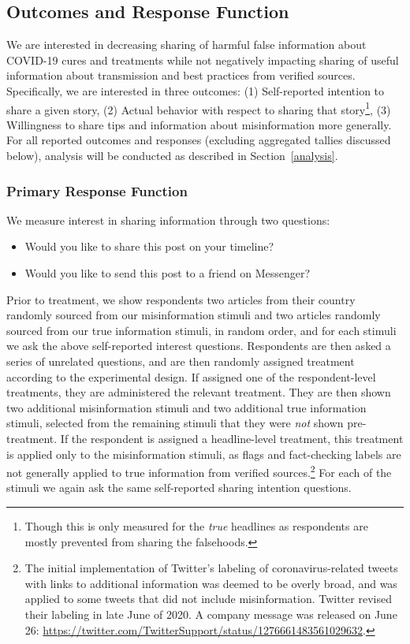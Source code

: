 \documentclass[letterpaper, 12pt, parskip=full,]{scrartcl}
\begin{document}
\subsection{Outcomes and Response Function}

We are interested in decreasing sharing of harmful false information about COVID-19 cures and treatments while not negatively impacting sharing of useful information about transmission and best practices from verified sources. Specifically, we are interested in three outcomes: (1) Self-reported intention to share a given story, (2) Actual behavior with respect to sharing that story\footnote{Though this is only measured for the \textit{true} headlines as respondents are mostly prevented from sharing the falsehoods.}, (3) Willingness to share tips and information about misinformation more generally. For all reported outcomes and responses (excluding aggregated tallies discussed below), analysis will be conducted as described in Section~\ref{analysis}.  

\subsubsection{Primary Response Function}

We measure interest in sharing information through two questions:
\begin{itemize}
\item Would you like to share this post on your timeline? 
\item Would you like to send this post to a friend on Messenger?
\end{itemize}

Prior to treatment, we show respondents two articles from their country randomly sourced from our misinformation stimuli and two articles randomly sourced from our true information stimuli, in random order, and for each stimuli we ask the above self-reported interest questions. Respondents are then asked a series of unrelated questions, and are then randomly assigned treatment according to the experimental design. If assigned one of the respondent-level treatments, they are administered the relevant treatment. They are then shown two additional misinformation stimuli and two additional true information stimuli, selected from the remaining stimuli that they were \textit{not} shown pre-treatment. If the respondent is assigned a headline-level treatment, this treatment is applied only to the misinformation stimuli, as flags and fact-checking labels are not generally applied to true information from verified sources.\footnote{The initial implementation of Twitter's labeling of coronavirus-related tweets with links to additional information was deemed to be overly broad, and was applied to some tweets that did not include misinformation. Twitter revised their labeling in late June of 2020. A company message was released on June 26: \url{https://twitter.com/TwitterSupport/status/1276661483561029632}. } For each of the stimuli we again ask the same self-reported sharing intention questions. 
\end{document}
